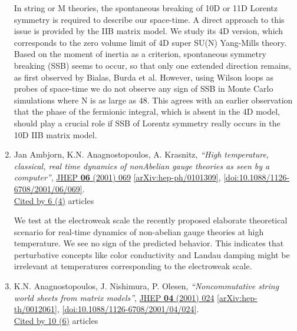 \documentclass[a4paper,10pt]{article}
\begin{document}
\begin{enumerate}
In string or M theories, the spontaneous breaking of 10D or 11D Lorentz symmetry is required to describe our space-time. A direct approach to this issue is provided by the IIB matrix model. We study its 4D version, which corresponds to the zero volume limit of 4D super SU(N) Yang-Mills theory. Based on the moment of inertia as a criterion, spontaneous symmetry breaking (SSB) seems to occur, so that only one extended direction remains, as first observed by Bialas, Burda et al. However, using Wilson loops as probes of space-time we do not observe any sign of SSB in Monte Carlo simulations where N is as large as 48. This agrees with an earlier observation that the phase of the fermionic integral, which is absent in the 4D model, should play a crucial role if SSB of Lorentz symmetry really occurs in the 10D IIB matrix model.
\item Jan Ambjorn, K.N. Anagnostopoulos, A. Krasnitz, {\it ``High temperature, classical, real time dynamics of nonAbelian gauge theories as seen by a computer''}, \href{https://www.doi.org/10.1088/1126-6708/2001/06/069}{JHEP {\bf 06} (2001) 069} \href{https://arxiv.org/abs/hep-ph/0101309}{[arXiv:hep-ph/0101309]}, \href{https://www.doi.org/10.1088/1126-6708/2001/06/069}{[doi:10.1088/1126-6708/2001/06/069]}.
\\\href{https://inspirehep.net/literature/?q=refersto%3Arecid%3A552548}{Cited by 6 (4)} articles

We test at the electroweak scale the recently proposed elaborate theoretical scenario for real-time dynamics of non-abelian gauge theories at high temperature. We see no sign of the predicted behavior. This indicates that perturbative concepts like color conductivity and Landau damping might be irrelevant at temperatures corresponding to the electroweak scale.
\item K.N. Anagnostopoulos, J. Nishimura, P. Olesen, {\it ``Noncommutative string world sheets from matrix models''}, \href{https://www.doi.org/10.1088/1126-6708/2001/04/024}{JHEP {\bf 04} (2001) 024} \href{https://arxiv.org/abs/hep-th/0012061}{[arXiv:hep-th/0012061]}, \href{https://www.doi.org/10.1088/1126-6708/2001/04/024}{[doi:10.1088/1126-6708/2001/04/024]}.
\\\href{https://inspirehep.net/literature/?q=refersto%3Arecid%3A538190}{Cited by 10 (6)} articles


\end{enumerate}
\end{document}

